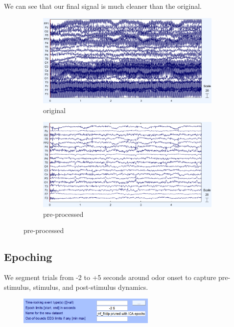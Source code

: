 \documentclass[hidelinks,12pt]{article}
\begin{document}
	We can see that our final signal is much cleaner than the original.
	
	\begin{figure}[!h]
		\centering
		\begin{subfigure}{0.45\textwidth}
			\centering
			\includegraphics[width=\linewidth]{26}
			\caption{original}
		\end{subfigure}
		\hfill
		\begin{subfigure}{0.45\textwidth}
			\centering
			\includegraphics[width=\linewidth]{27}
			\caption{pre-processed}
		\end{subfigure}
	\end{figure}
	
	\subsection{Epoching}
		We segment trials from -2 to +5 seconds around odor onset to capture pre-stimulus, stimulus, and post-stimulus dynamics.
		
		\begin{figure}[h!]
			\centering
			\includegraphics[width=0.6\textwidth]{28}
		\end{figure}
\end{document}

